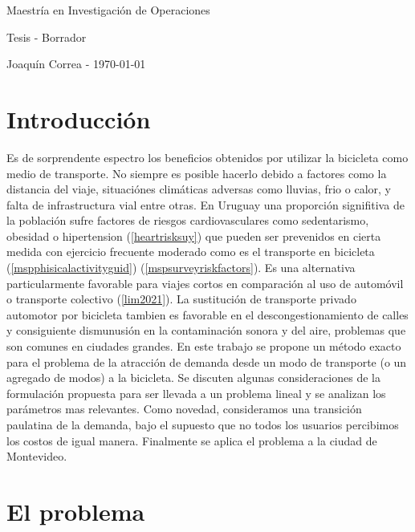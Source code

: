\documentclass{article}
\begin{document}
  \begin{center}
    {\sc \large Maestría en Investigación de Operaciones}

    {\sc \large Tesis - Borrador}
    \linebreak

    {\rm Joaquín Correa - \today}
  \end{center}

  \tableofcontents

  \section*{Introducción}

  Es de sorprendente espectro los beneficios obtenidos por utilizar la bicicleta como medio de transporte. No siempre es posible hacerlo debido a factores como la distancia del viaje, situaciónes climáticas adversas como lluvias, frio o calor, y falta de infrastructura vial entre otras. En Uruguay una proporción signifitiva de la población sufre factores de riesgos cardiovasculares como sedentarismo, obesidad o hipertension (\ref{heartrisksuy}) que pueden ser prevenidos en cierta medida con ejercicio frecuente moderado como es el transporte en bicicleta (\ref{mspphisicalactivityguid}) (\ref{mspsurveyriskfactors}). Es una alternativa particularmente favorable para viajes cortos en comparación al uso de automóvil o transporte colectivo (\ref{lim2021}). La sustitución de transporte privado automotor por bicicleta tambien es favorable en el descongestionamiento de calles y consiguiente dismunusión en la contaminación sonora y del aire, problemas que son comunes en ciudades grandes. En este trabajo se propone un método exacto para el problema de la atracción de demanda desde un modo de transporte (o un agregado de modos) a la bicicleta. Se discuten algunas consideraciones de la formulación propuesta para ser llevada a un problema lineal y se analizan los parámetros mas relevantes. Como novedad, consideramos una transición paulatina de la demanda, bajo el supuesto que no todos los usuarios percibimos los costos de igual manera. Finalmente se aplica el problema a la ciudad de Montevideo.

  \section{El problema}
\end{document}
